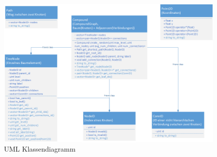 \documentclass[11pt]{beamer}
\begin{document}
\begin{frame}[allowframebreaks]
\begin{figure}
\centering
\includegraphics[width=0.85\linewidth]{./UML_tree}
\caption[UML Klassen]{UML Klassendiagramm}
\label{fig:UML_tree}
\end{figure}

\end{frame}
\end{document}
